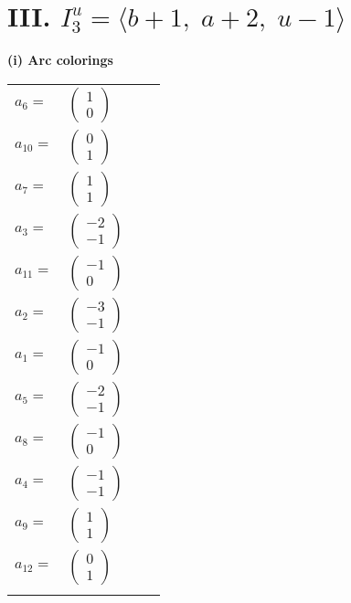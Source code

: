 \documentclass[1p]{elsarticle_modified}
\theoremstyle{definition}
\begin{document}
\centering \section*{III. $I^u_{3}= \langle b+1,\;a+2,\;u-1 \rangle$}
\flushleft \textbf{(i) Arc colorings}\\
\begin{tabular}{m{7pt} m{180pt} m{7pt} m{180pt} }
\flushright $a_{6}=$&$\begin{pmatrix}1\\0\end{pmatrix}$ \\
\flushright $a_{10}=$&$\begin{pmatrix}0\\1\end{pmatrix}$ \\
\flushright $a_{7}=$&$\begin{pmatrix}1\\1\end{pmatrix}$ \\
\flushright $a_{3}=$&$\begin{pmatrix}-2\\-1\end{pmatrix}$ \\
\flushright $a_{11}=$&$\begin{pmatrix}-1\\0\end{pmatrix}$ \\
\flushright $a_{2}=$&$\begin{pmatrix}-3\\-1\end{pmatrix}$ \\
\flushright $a_{1}=$&$\begin{pmatrix}-1\\0\end{pmatrix}$ \\
\flushright $a_{5}=$&$\begin{pmatrix}-2\\-1\end{pmatrix}$ \\
\flushright $a_{8}=$&$\begin{pmatrix}-1\\0\end{pmatrix}$ \\
\flushright $a_{4}=$&$\begin{pmatrix}-1\\-1\end{pmatrix}$ \\
\flushright $a_{9}=$&$\begin{pmatrix}1\\1\end{pmatrix}$ \\
\flushright $a_{12}=$&$\begin{pmatrix}0\\1\end{pmatrix}$\\&\end{tabular}
\end{document}
